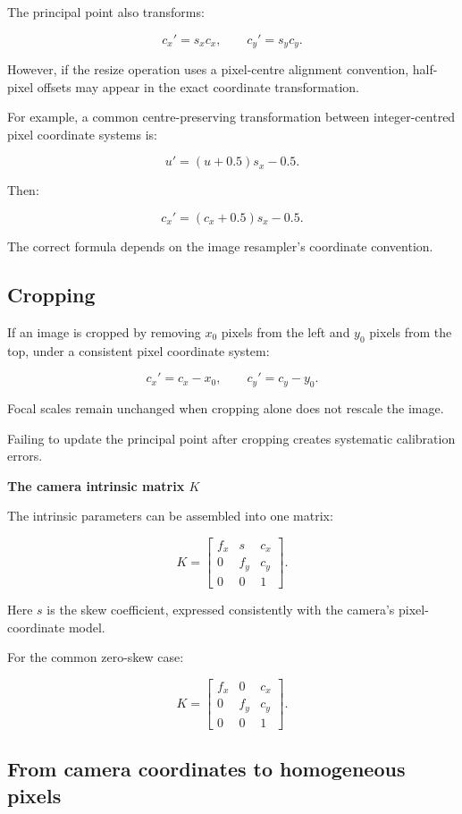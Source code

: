 The principal point also transforms:

\[
 \boxed{ c_x'=s_xc_x, \qquad c_y'=s_yc_y }.
\]

However, if the resize operation uses a pixel-centre alignment convention, half-pixel offsets may appear in the exact coordinate transformation.

For example, a common centre-preserving transformation between integer-centred pixel coordinate systems is:

\[
 u'=(u+0.5)s_x-0.5.
\]

Then:

\[
 \boxed{ c_x'=(c_x+0.5)s_x-0.5 }.
\]

The correct formula depends on the image resampler's coordinate convention.

\subsection{Cropping}\label{02-foundations-ii-ch034-cropping}

If an image is cropped by removing \(x_0\) pixels from the left and \(y_0\) pixels from the top, under a consistent pixel coordinate system:

\[
 \boxed{ c_x'=c_x-x_0, \qquad c_y'=c_y-y_0 }.
\]

Focal scales remain unchanged when cropping alone does not rescale the image.

Failing to update the principal point after cropping creates systematic calibration errors.

\textbf{The camera intrinsic matrix \(K\)}

The intrinsic parameters can be assembled into one matrix:

\[
 \boxed{ K= \begin{bmatrix} f_x&s&c_x\\ 0&f_y&c_y\\ 0&0&1 \end{bmatrix} }.
\]

Here \(s\) is the skew coefficient, expressed consistently with the camera's pixel-coordinate model.

For the common zero-skew case:

\[
 \boxed{ K= \begin{bmatrix} f_x&0&c_x\\ 0&f_y&c_y\\ 0&0&1 \end{bmatrix} }.
\]

\subsection{From camera coordinates to homogeneous pixels}\label{02-foundations-ii-ch034-from-camera-coordinates-to-homogeneous-pixels}

